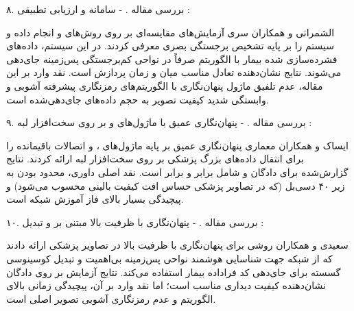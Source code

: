 ۸. بررسی مقاله .  {-} سامانه  و ارزیابی تطبیقی :\par

الشمرانی و همکاران سری آزمایش‌های مقایسه‌ای بر روی روش‌های  و  انجام داده و سیستم  را بر پایه تشخیص برجستگی بصری  معرفی کردند. در این سیستم، داده‌های فشرده‌سازی شده بیمار با الگوریتم  صرفاً در نواحی کم‌برجستگی پس‌زمینه جای‌دهی می‌شوند. نتایج نشان‌دهنده تعادل مناسب میان  و زمان پردازش است. نقد وارد بر این مقاله، عدم تلفیق ماژول پنهان‌نگاری با الگوریتم‌های رمزنگاری پیشرفته آشوبی و وابستگی شدید کیفیت تصویر به حجم داده‌های جای‌دهی‌شده است.\par



۹. بررسی مقاله .  {-} پنهان‌نگاری عمیق با ماژول‌های  و  بر روی سخت‌افزار لبه :\par

ایساک و همکاران معماری پنهان‌نگاری عمیق بر پایه ماژول‌های  ،  و اتصالات باقیمانده را برای انتقال داده‌های بزرگ پزشکی بر روی سخت‌افزار لبه  ارائه کردند. نتایج گزارش‌شده برای دادگان  و  شامل  برابر  و  برابر  است. نقد اصلی داوری، محدود بودن  به زیر ۴۰ دسی‌بل (که در تصاویر پزشکی حساس افت کیفیت بالینی محسوب می‌شود) و پیچیدگی بسیار بالای فاز آموزش شبکه است.\par



۱۰. بررسی مقاله .  {-} پنهان‌نگاری با ظرفیت بالا مبتنی بر  و تبدیل  :\par

سعیدی و همکاران روشی برای پنهان‌نگاری با ظرفیت بالا در تصاویر پزشکی ارائه دادند که از شبکه  جهت شناسایی هوشمند نواحی پس‌زمینه بی‌اهمیت و تبدیل کوسینوسی گسسته  برای جای‌دهی کد  فراداده بیمار استفاده می‌کند. نتایج آزمایش بر روی دادگان  نشان‌دهنده کیفیت دیداری مناسب است؛ اما نقد وارد بر آن، پیچیدگی زمانی بالای الگوریتم  و عدم رمزنگاری آشوبی تصویر اصلی است.\par

